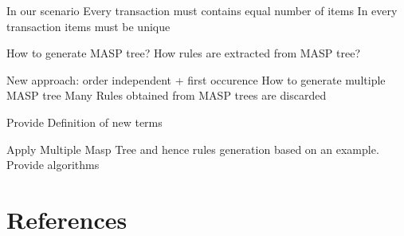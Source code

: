 \documentclass[review]{elsarticle}
\begin{document}
In our scenario
Every transaction must contains equal number of items
In every transaction items must be unique

How to generate MASP tree?
How rules are extracted from MASP tree?

New approach: order independent + first occurence
How to generate multiple MASP tree
Many Rules obtained from MASP trees are discarded

Provide Definition of new terms

Apply Multiple Masp Tree and hence rules generation based on an example.
Provide algorithms


\section*{References}


\end{document}
